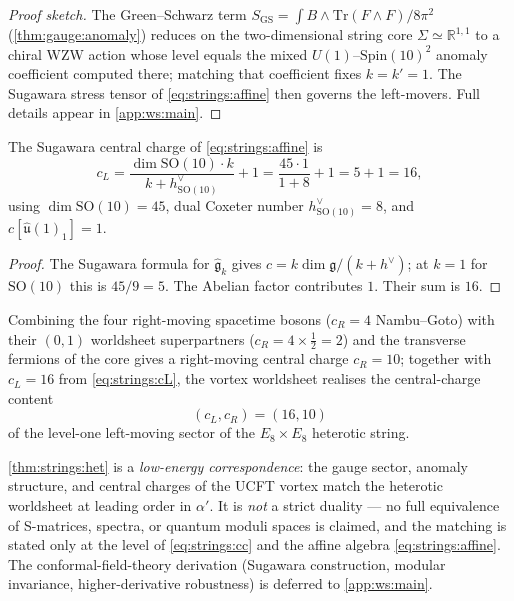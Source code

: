 \begin{proof}[Proof sketch]
The Green--Schwarz term $S_{\mathrm{GS}}=\int B\wedge
\mathrm{Tr}(F\wedge F)/8\pi^{2}$ (\autoref{thm:gauge:anomaly}) reduces on
the two-dimensional string core $\Sigma\simeq\mathbb{R}^{1,1}$ to a
chiral WZW action whose level equals the mixed
$U(1)$--$\mathrm{Spin}(10)^{2}$ anomaly coefficient computed there;
matching that coefficient fixes $k=k'=1$. The Sugawara stress tensor of
\eqref{eq:strings:affine} then governs the left-movers. Full details
appear in \autoref{app:ws:main}.
\end{proof}

\begin{theorem}
\label{thm:strings:cl}
The Sugawara central charge of \eqref{eq:strings:affine} is
\begin{equation}
  c_{L}
   = \frac{\dim\mathrm{SO}(10)\cdot k}{k+h^{\vee}_{\mathrm{SO}(10)}}
     + 1
   = \frac{45\cdot 1}{1+8} + 1
   = 5 + 1
   = \boxed{16},
  \label{eq:strings:cL}
\end{equation}
using $\dim\mathrm{SO}(10)=45$, dual Coxeter number
$h^{\vee}_{\mathrm{SO}(10)}=8$, and $c[\widehat{\mathfrak u}(1)_{1}]=1$.
\end{theorem}

\begin{proof}
The Sugawara formula for $\widehat{\mathfrak g}_{k}$ gives
$c=k\dim\mathfrak g/(k+h^{\vee})$; at $k=1$ for
$\mathrm{SO}(10)$ this is $45/9=5$. The Abelian factor contributes $1$.
Their sum is $16$.
\end{proof}

\begin{theorem}
\label{thm:strings:het}
Combining the four right-moving spacetime bosons ($c_{R}=4$ Nambu--Goto)
with their $(0,1)$ worldsheet superpartners ($c_{R}=4\times\tfrac12=2$)
and the transverse fermions of the core gives a right-moving central
charge $c_{R}=10$; together with $c_{L}=16$ from \eqref{eq:strings:cL},
the vortex worldsheet realises the central-charge content
\begin{equation}
  (c_{L},c_{R})=(16,10)
  \label{eq:strings:cc}
\end{equation}
of the level-one left-moving sector of the $E_{8}\times E_{8}$ heterotic
string.
\end{theorem}

\begin{remark}
\label{rem:strings:corr}
\autoref{thm:strings:het} is a \emph{low-energy correspondence}: the
gauge sector, anomaly structure, and central charges of the UCFT vortex
match the heterotic worldsheet at leading order in $\alpha'$. It is
\emph{not} a strict duality --- no full equivalence of S-matrices,
spectra, or quantum moduli spaces is claimed, and the matching is stated
only at the level of \eqref{eq:strings:cc} and the affine algebra
\eqref{eq:strings:affine}. The conformal-field-theory derivation
(Sugawara construction, modular invariance, higher-derivative
robustness) is deferred to \autoref{app:ws:main}.
\end{remark}

